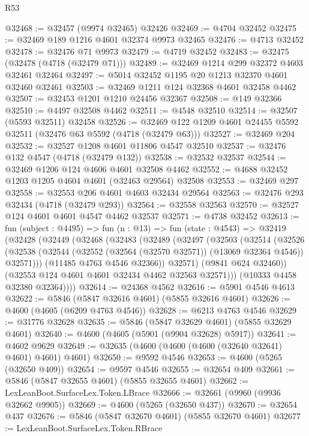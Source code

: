 \begin{lexlean}{R53}
\begin{coremodule}
@32468 := @32457 (@9974 @32465) @32426
@32469 := @4704 @32452
@32475 := @32469 @189 @1216 @4601 @32374 @9973 @32465
@32476 := @4713 @32452
@32478 := @32476 @71 @9973
@32479 := @4719 @32452
@32483 := @32475 (@32478 (@4718 (@32479 @71)))
@32489 := @32469 @1214 @299 @32372 @4603 @32461 @32464
@32497 := @5014 @32452 @1195 @20 @1213 @32370 @4601 @32460 @32461
@32503 := @32469 @1211 @124 @32368 @4601 @32458 @4462
@32507 := @32453 @1201 @1210 @24456 @32367
@32508 := @149 @32366
@32510 := @4497 @32508 @4462
@32511 := @4548 @32510
@32514 := @32507 (@5593 @32511) @32458
@32526 := @32469 @122 @1209 @4601 @24455 @5592 @32511 (@32476 @63 @5592 (@4718 (@32479 @63)))
@32527 := @32469 @204
@32532 := @32527 @1208 @4601 @11806 @4547 @32510
@32537 := @32476 @132 @4547 (@4718 (@32479 @132))
@32538 := @32532 @32537
@32544 := @32469 @1206 @124 @4606 @4601 @32508 @4462
@32552 := @4688 @32452 @1203 @1205 @4604 @4601 (@32463 @29564) @32508
@32553 := @32469 @297
@32558 := @32553 @206 @4601 @4603 @32434 @29564
@32563 := @32476 @293 @32434 (@4718 (@32479 @293))
@32564 := @32558 @32563
@32570 := @32527 @124 @4601 @4601 @4547 @4462 @32537
@32571 := @4738 @32452
@32613 := fun (subject : @4495) =>
  fun (n : @13) =>
  fun (state : @4543) =>
  @32419
    (@32428
      (@32449
        (@32468
          (@32483
            (@32489
              (@32497
                (@32503
                  (@32514
                    (@32526
                      (@32538
                        (@32544 (@32552 (@32564 (@32570 @32571)) (@13069 @32364 @4546)) @32571)))
                    (@11485 @4763 @4546 @32366))
                  @32571)
                (@9841 @624 @32460))
              (@32553 @124 @4601 @4601 @32434 @4462 @32563 @32571)))
          (@10333 @4458 @32380 @32364))))
@32614 := @24368 @4562
@32616 := @5901 @4546 @4613
@32622 := @5846 (@5847 @32616 @4601) (@5855 @32616 @4601)
@32626 := @4600 (@4605 (@6209 @4763 @4546))
@32628 := @6213 @4763 @4546
@32629 := @31776 @32628
@32635 := @5846 (@5847 @32629 @4601) (@5855 @32629 @4601)
@32640 := @4600 (@4605 (@5901 (@9904 @32628) @5917))
@32641 := @4602 @9629
@32649 := @32635 (@4600 (@4600 (@4600 (@32640 @32641) @4601) @4601) @4601)
@32650 := @9592 @4546
@32653 := @4600 (@5265 (@32650 @409))
@32654 := @9597 @4546
@32655 := @32654 @409
@32661 := @5846 (@5847 @32655 @4601) (@5855 @32655 @4601)
@32662 := LexLeanBoot.SurfaceLex.Token.LBrace
@32666 := @32661 (@9960 (@9936 @32662 @9905))
@32669 := @4600 (@5265 (@32650 @437))
@32670 := @32654 @437
@32676 := @5846 (@5847 @32670 @4601) (@5855 @32670 @4601)
@32677 := LexLeanBoot.SurfaceLex.Token.RBrace

\end{coremodule}
\end{lexlean}
